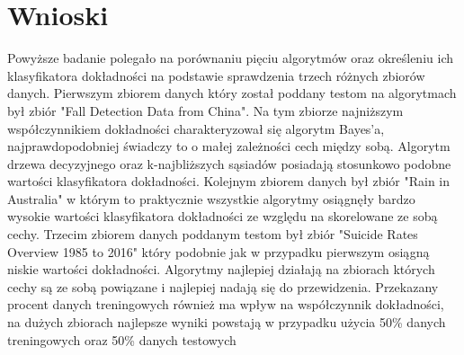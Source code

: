 \documentclass[a4paper,11pt]{article}
\begin{document}
\section{Wnioski}

Powyższe badanie polegało na porównaniu pięciu algorytmów oraz określeniu ich klasyfikatora dokładności na podstawie sprawdzenia trzech różnych zbiorów danych.
Pierwszym zbiorem danych który został poddany testom na algorytmach był zbiór "Fall Detection Data from China". Na tym zbiorze najniższym współczynnikiem dokładności charakteryzował się algorytm Bayes'a, najprawdopodobniej świadczy to o małej zależności cech między sobą. Algorytm drzewa decyzyjnego oraz k-najbliższych sąsiadów posiadają stosunkowo podobne wartości klasyfikatora dokładności. Kolejnym zbiorem danych był zbiór "Rain in Australia" w którym to praktycznie wszystkie algorytmy osiągnęły bardzo wysokie wartości klasyfikatora dokładności ze względu na skorelowane ze sobą cechy. Trzecim zbiorem danych poddanym testom był zbiór "Suicide Rates Overview 1985 to 2016" który podobnie jak w przypadku pierwszym osiągną niskie wartości dokładności. Algorytmy najlepiej działają na zbiorach których cechy są ze sobą powiązane i najlepiej nadają się do przewidzenia. Przekazany procent danych treningowych również ma wpływ na współczynnik dokładności, na dużych zbiorach najlepsze wyniki powstają w przypadku użycia 50\% danych treningowych oraz 50\% danych testowych 
\end{document}
